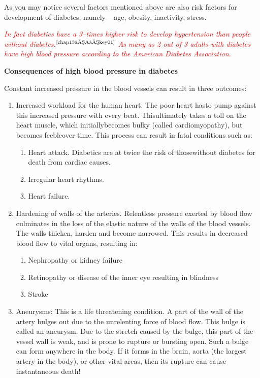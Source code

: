 As you may notice several factors mentioned above are also risk factors for development of diabetes, namely – age, obesity, inactivity, stress.

\textcolor{red}{\textit{In fact diabetics have a 3–times higher risk to develop hypertension than people without diabetes.}}$^{\text{\cite{chap13–A–key01}}}$ \textcolor{red}{\textit{As many as 2 out of 3 adults with diabetes have high blood pressure according to the American Diabetes Association.}}

\vskip 8pt
\noindent\textbf{Consequences of high blood pressure in diabetes}

Constant increased pressure in the blood vessels can result in three outcomes:

\vspace{-\topsep}
\begin{enumerate}
\itemsep=0pt
\item Increased workload for the human heart. The poor heart has\break to pump against this increased pressure with every beat. This\break ultimately takes a toll on the heart muscle, which initially\break becomes bulky (called cardiomyopathy), but becomes feeble\break over time. This process can result in fatal conditions such as:
\begin{enumerate}
\itemsep=0pt
 \item Heart attack. Diabetics are at twice the risk of those\break without diabetes for death from cardiac causes.
\item Irregular heart rhythms.
\item Heart failure.
\end{enumerate}
\item Hardening of walls of the arteries. Relentless pressure exerted by blood flow culminates in the loss of the elastic nature of the walls of the blood vessels. The walls thicken, harden and become narrowed. This results in decreased blood flow to vital organs, resulting in:
\begin{enumerate}
\itemsep=0pt
\item Nephropathy or kidney failure
\item Retinopathy or disease of the inner eye resulting in blindness
\item Stroke
\end{enumerate}
\item Aneurysms: This is a life threatening condition. A part of the wall of the artery bulges out due to the unrelenting force of blood flow. This bulge is called an aneurysm. Due to the stretch caused by the bulge, this part of the vessel wall is weak, and is prone to rupture or bursting open. Such a bulge can form anywhere in the body. If it forms in the brain, aorta (the largest artery in the body), or other vital areas, then its rupture can cause instantaneous death!
\end{enumerate}
\vspace{-\topsep}

